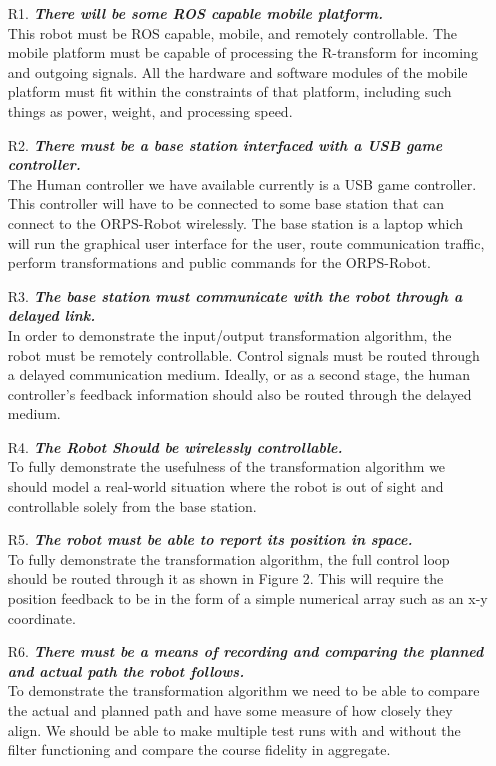 \documentclass[english,12pt]{article}
\begin{document}
\begin{itemize}
    \item[R1.] \textit{\textbf{There will be some ROS capable mobile platform.}} \\
    This robot must be ROS capable, mobile, and remotely controllable. The mobile platform must be
    capable of processing the R-transform for incoming and outgoing signals. All the hardware and software
    modules of the mobile platform must fit within the constraints of that platform, including such things as
    power, weight, and processing speed.
    \item[R2.] \textit{\textbf{There must be a base station interfaced with a USB game controller.}} \\
    The Human controller we have available currently is a USB game controller. This controller will have to
    be connected to some base station that can connect to the ORPS-Robot wirelessly. The base station is a
    laptop which will run the graphical user interface for the user, route communication traffic, perform
    transformations and public commands for the ORPS-Robot.
    \item[R3.] \textit{\textbf{The base station must communicate with the robot through a delayed link.}} \\
    In order to demonstrate the input/output transformation algorithm, the robot must be remotely
    controllable. Control signals must be routed through a delayed communication medium. Ideally, or as a
    second stage, the human controller’s feedback information should also be routed through the delayed
    medium.
    \item[R4.] \textit{\textbf{The Robot Should be wirelessly controllable.}} \\
    To fully demonstrate the usefulness of the transformation algorithm we should model a real-world situation
    where the robot is out of sight and controllable solely from the base station.
    \item[R5.] \textit{\textbf{The robot must be able to report its position in space.}} \\
    To fully demonstrate the transformation algorithm, the full control loop should be routed
    through it as shown in Figure 2. This will require the position feedback to be in the form of a simple
    numerical array such as an x-y coordinate.
    \item[R6.] \textit{\textbf{There must be a means of recording and comparing the planned and actual path the robot follows.}} \\
    To demonstrate the transformation algorithm we need to be able to compare the actual
    and planned path and have some measure of how closely they align. We should be able to make
    multiple test runs with and without the filter functioning and compare the course fidelity in aggregate.
\end{itemize}
\end{document}
